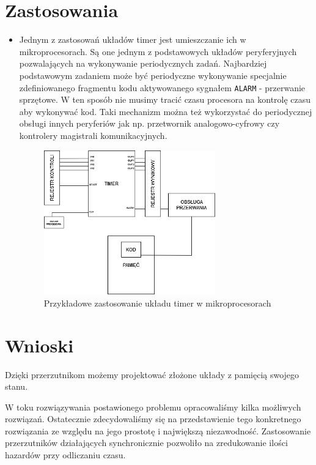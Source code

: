 \documentclass[a4paper]{article}
\begin{document}
\section{Zastosowania}
\begin{itemize}
    \item Jednym z zastosowań układów timer jest umieszczanie ich w mikroprocesorach. Są one jednym 
            z podstawowych układów peryferyjnych pozwalających na wykonywanie periodycznych 
            zadań. Najbardziej podstawowym zadaniem może być periodyczne wykonywanie specjalnie
            zdefiniowanego fragmentu kodu aktywowanego sygnałem \verb|ALARM| - przerwanie sprzętowe.
            W ten sposób nie musimy tracić czasu procesora na kontrolę czasu aby wykonywać kod. 
            Taki mechanizm można też wykorzystać do periodycznej obsługi innych peryferiów jak np.
            przetwornik analogowo-cyfrowy czy kontrolery magistrali komunikacyjnych.
    \begin{figure}[H]
        \centering
        \includegraphics[width=0.7\textwidth]{timer_use_mcu.png}
        \caption{Przykładowe zastosowanie układu timer w mikroprocesorach}
    \end{figure}
\end{itemize}

\pagebreak
\section{Wnioski}
Dzięki przerzutnikom możemy projektować złożone układy z pamięcią swojego stanu. 

W toku rozwiązywania postawionego problemu opracowaliśmy kilka możliwych rozwiązań. Ostatecznie
zdecydowaliśmy się na przedstawienie tego konkretnego rozwiązania ze względu na jego prostotę i 
największą niezawodność. Zastosowanie przerzutników działających synchronicznie pozwoliło na zredukowanie
ilości hazardów przy odliczaniu czasu.
\end{document}
